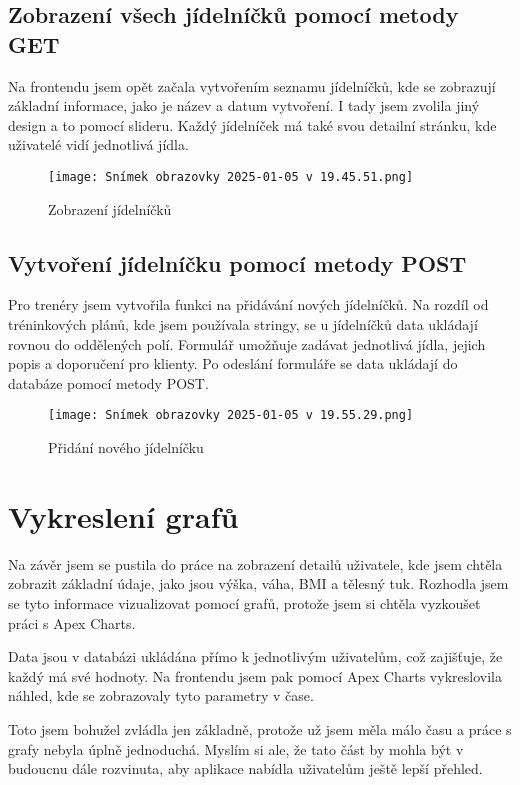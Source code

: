 \documentclass[12pt, a4paper,
twoside,        %
openany
]{report}
\begin{document}
\subsection{Zobrazení všech jídelníčků pomocí metody GET}
Na frontendu jsem opět začala vytvořením seznamu jídelníčků, kde se zobrazují základní informace, jako je název a datum vytvoření. I tady jsem zvolila jiný design a to pomocí slideru. Každý jídelníček má také svou detailní stránku, kde uživatelé vidí jednotlivá jídla.

\begin{figure}[h]
    \centering
    \texttt{[image: Snímek obrazovky 2025-01-05 v 19.45.51.png]}
    \caption{Zobrazení jídelníčků}
\end{figure}

\clearpage
\subsection{Vytvoření jídelníčku pomocí metody POST}
Pro trenéry jsem vytvořila funkci na přidávání nových jídelníčků. Na rozdíl od tréninkových plánů, kde jsem používala stringy, se u jídelníčků data ukládají rovnou do oddělených polí. Formulář umožňuje zadávat jednotlivá jídla, jejich popis a doporučení pro klienty. Po odeslání formuláře se data ukládají do databáze pomocí metody POST.

\begin{figure}[h]
    \centering
    \texttt{[image: Snímek obrazovky 2025-01-05 v 19.55.29.png]}
    \caption{Přidání nového jídelníčku}
\end{figure}

\clearpage
\section{Vykreslení grafů}
Na závěr jsem se pustila do práce na zobrazení detailů uživatele, kde jsem chtěla zobrazit základní údaje, jako jsou výška, váha, BMI a tělesný tuk. Rozhodla jsem se tyto informace vizualizovat pomocí grafů, protože jsem si chtěla vyzkoušet práci s Apex Charts.

Data jsou v databázi ukládána přímo k jednotlivým uživatelům, což zajišťuje, že každý má své hodnoty. Na frontendu jsem pak pomocí Apex Charts vykreslovila náhled, kde se zobrazovaly tyto parametry v čase. 

Toto jsem bohužel zvládla jen základně, protože už jsem měla málo času a práce s grafy nebyla úplně jednoduchá. Myslím si ale, že tato část by mohla být v budoucnu dále rozvinuta, aby aplikace nabídla uživatelům ještě lepší přehled.
\end{document}
